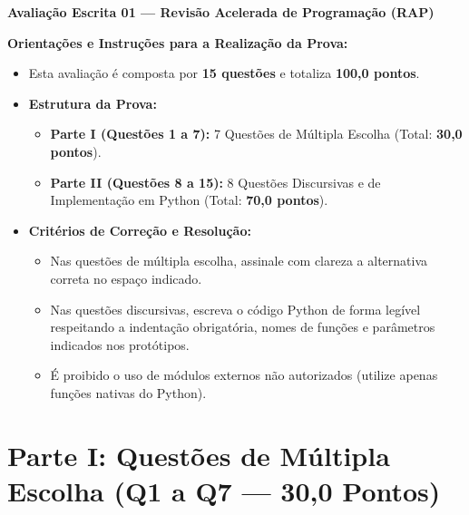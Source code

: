 \vspace{0.8cm}

\noindent \textbf{\Large Avaliação Escrita 01 — Revisão Acelerada de Programação (RAP)}

\vspace{0.3cm}
\noindent \textbf{Orientações e Instruções para a Realização da Prova:}
\begin{itemize}[leftmargin=*]
    \item Esta avaliação é composta por \textbf{15 questões} e totaliza \textbf{100,0 pontos}.
    \item \textbf{Estrutura da Prova:}
    \begin{itemize}
        \item \textbf{Parte I (Questões 1 a 7):} 7 Questões de Múltipla Escolha (Total: \textbf{30,0 pontos}).
        \item \textbf{Parte II (Questões 8 a 15):} 8 Questões Discursivas e de Implementação em Python (Total: \textbf{70,0 pontos}).
    \end{itemize}
    \item \textbf{Critérios de Correção e Resolução:}
    \begin{itemize}
        \item Nas questões de múltipla escolha, assinale com clareza a alternativa correta no espaço indicado.
        \item Nas questões discursivas, escreva o código Python de forma legível respeitando a indentação obrigatória, nomes de funções e parâmetros indicados nos protótipos.
        \item É proibido o uso de módulos externos não autorizados (utilize apenas funções nativas do Python).
    \end{itemize}
\end{itemize}

\vspace{0.4cm}

\section*{Parte I: Questões de Múltipla Escolha (Q1 a Q7 — 30,0 Pontos)}


